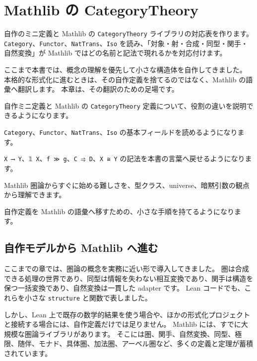\chapter{Mathlib の CategoryTheory}
\label{chap:mathlib-category-theory}

\begin{chapterabstract}
自作のミニ定義と Mathlib の \texttt{CategoryTheory} ライブラリの対応表を作ります。
\texttt{Category}、\texttt{Functor}、\texttt{NatTrans}、\texttt{Iso} を読み、「対象・射・合成・同型・関手・自然変換」が Mathlib ではどの名前と記法で現れるかを対応付けます。

ここまで本書では、概念の理解を優先して小さな構造体を自作してきました。
本格的な形式化に進むときは、その自作定義を捨てるのではなく、Mathlib の語彙へ翻訳します。
本章は、その翻訳のための足場です。
\end{chapterabstract}

\begin{learninggoals}
\item 自作ミニ定義と Mathlib の \texttt{CategoryTheory} 定義について、役割の違いを説明できるようになります。
\item \texttt{Category}、\texttt{Functor}、\texttt{NatTrans}、\texttt{Iso} の基本フィールドを読めるようになります。
\item \texttt{X ⟶ Y}、\texttt{𝟙 X}、\texttt{f ≫ g}、\texttt{C ⥤ D}、\texttt{X ≅ Y} の記法を本書の言葉へ戻せるようになります。
\item Mathlib 圏論からすぐに始める難しさを、型クラス、universe、暗黙引数の観点から理解できます。
\item 自作定義を Mathlib の語彙へ移すための、小さな手順を持てるようになります。
\end{learninggoals}

\section{自作モデルから Mathlib へ進む}

ここまでの章では、圏論の概念を実務に近い形で導入してきました。
圏は合成できる処理の世界であり、同型は情報を失わない相互変換であり、関手は構造を保つ一括変換であり、自然変換は一貫した adapter です。
Lean コードでも、これらを小さな \texttt{structure} と関数で表しました。

しかし、Lean 上で既存の数学的結果を使う場合や、ほかの形式化プロジェクトと接続する場合には、自作定義だけでは足りません。
Mathlib には、すでに大規模な圏論ライブラリがあります。
そこには圏、関手、自然変換、同型、極限、随伴、モナド、具体圏、加法圏、アーベル圏など、多くの定義と定理が蓄積されています。


